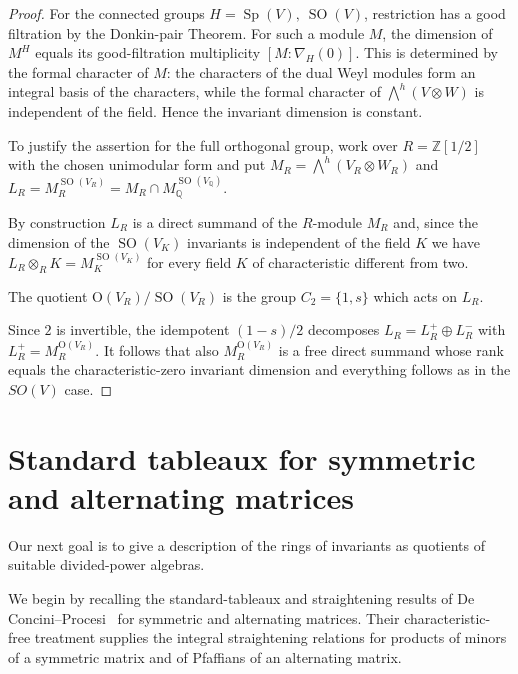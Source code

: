 \documentclass[10pt]{amsart}
\theoremstyle{definition}
\theoremstyle{remark}
\newcommand{\Q}{\mathbb Q}
\newcommand{\Sp}{\operatorname{Sp}}
\newcommand{\SO}{\operatorname{SO}}
\begin{document}
\begin{proof}
For the connected groups $H=\Sp(V),\ \SO(V)$, restriction
has a good filtration by the Donkin-pair Theorem. For such a module
$M$, the dimension of $M^H$ equals its good-filtration multiplicity
$[M:\nabla_H(0)]$. This is determined by the formal character of $M$:
the   characters of the dual Weyl modules form an integral basis of the characters, while the
formal character of $\bigwedge^h(V\otimes W)$ is independent of the
field. Hence the invariant dimension is constant.\smallskip



To justify the assertion for the full orthogonal group, work over
$R=\mathbb Z[1/2]$ with the chosen unimodular form and put
$M_R=\bigwedge^h(V_R\otimes W_R)$ and
$L_R=M_R^{\SO(V_R)}=  M_R\cap M_\Q^{\SO(V_\Q)}$. \smallskip

By construction $L_R$ is a direct summand  of the $R$-module $M_R$  and, since the dimension of the $\SO(V_K)$ invariants is independent of the field $K$ we have $L_R\otimes_R K=M_K^{\SO(V_K)}$ for every field $K$ of characteristic different from two.
\smallskip

 










The quotient $\mathrm O(V_R)/\SO(V_R)$ is the   group $C_2=\{1,s\}$ which  acts on $L_R$. 

Since $2$ is invertible, the
idempotent $(1-s)/2$ decomposes  $L_R= L_R^+\oplus L_R^-$ with  $L_R^+=M_R^{\mathrm O(V_R)}$.
It follows that also $M_R^{\mathrm O(V_R)}$ is a free direct summand whose rank equals the
characteristic-zero invariant dimension and everything follows as in the $SO(V)$ case.
\end{proof}

 

\section{Standard tableaux for symmetric and alternating matrices}
\label{sec:classical-standard-tableaux} Our next goal is to give a description of the rings of invariants  as quotients of suitable divided-power algebras.\medskip


We begin by recalling the standard-tableaux and straightening results
of De Concini--Procesi~\cite{DeConciniProcesi1976} for symmetric and
alternating matrices. Their characteristic-free treatment supplies the
integral straightening relations for products of minors of a symmetric
matrix and of Pfaffians of an alternating matrix.\smallskip
\end{document}
